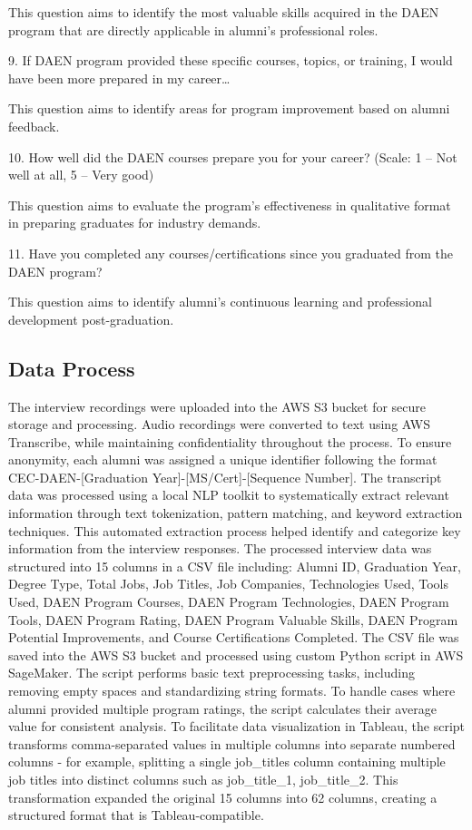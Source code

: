 \documentclass[12pt,a4paper]{article}
\begin{document}
This question aims to identify the most valuable skills acquired in the DAEN program that are directly applicable in alumni's professional roles.

9. If DAEN program provided these specific courses, topics, or training, I would have been more prepared in my career… 

This question aims to identify areas for program improvement based on alumni feedback.

10. How well did the DAEN courses prepare you for your career? (Scale: 1 -- Not well at all, 5 -- Very good) 

This question aims to evaluate the program's effectiveness in qualitative format in preparing graduates for industry demands.

11. Have you completed any courses/certifications since you graduated from the DAEN program? 

This question aims to identify alumni's continuous learning and professional development post-graduation.

\subsection{Data Process}
The interview recordings were uploaded into the AWS S3 bucket for secure storage and processing. Audio recordings were converted to text using AWS Transcribe, while maintaining confidentiality throughout the process. To ensure anonymity, each alumni was assigned a unique identifier following the format CEC-DAEN-[Graduation Year]-[MS/Cert]-[Sequence Number]. The transcript data was processed using a local NLP toolkit to systematically extract relevant information through text tokenization, pattern matching, and keyword extraction techniques. This automated extraction process helped identify and categorize key information from the interview responses. The processed interview data was structured into 15 columns in a CSV file including: Alumni ID, Graduation Year, Degree Type, Total Jobs, Job Titles, Job Companies, Technologies Used, Tools Used, DAEN Program Courses, DAEN Program Technologies, DAEN Program Tools, DAEN Program Rating, DAEN Program Valuable Skills, DAEN Program Potential Improvements, and Course Certifications Completed. The CSV file was saved into the AWS S3 bucket and processed using custom Python script in AWS SageMaker. The script performs basic text preprocessing tasks, including removing empty spaces and standardizing string formats. To handle cases where alumni provided multiple program ratings, the script calculates their average value for consistent analysis. To facilitate data visualization in Tableau, the script transforms comma-separated values in multiple columns into separate numbered columns - for example, splitting a single job\_titles column containing multiple job titles into distinct columns such as job\_title\_1, job\_title\_2. This transformation expanded the original 15 columns into 62 columns, creating a structured format that is Tableau-compatible.
\end{document}
